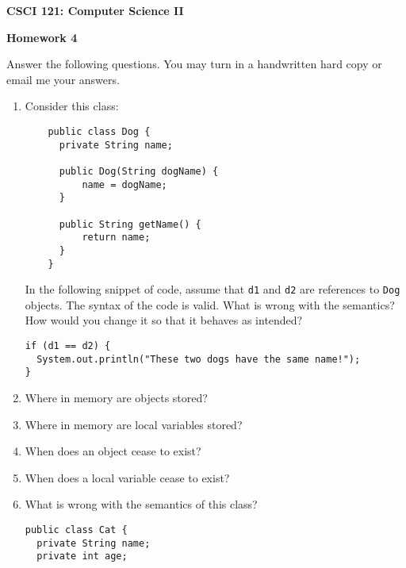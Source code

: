 \documentclass[11pt]{article}
\begin{document}
\centerline{\Large\bf CSCI 121: Computer Science II}

\vspace{.1in}

\centerline{\large\bf Homework 4}

\vspace{.25in}

Answer the following questions. You may turn in a handwritten hard copy or
email me your answers.

\begin{enumerate}
\def\labelenumi{\arabic{enumi}.}
\item
  Consider this class:

\begin{verbatim}
    public class Dog {
      private String name;
    
      public Dog(String dogName) {
          name = dogName;
      }
    
      public String getName() {
          return name;
      }
    }
\end{verbatim}

  In the following snippet of code, assume that \texttt{d1} and
  \texttt{d2} are references to \texttt{Dog} objects. The syntax of the
  code is valid. What is wrong with the semantics? How would you change
  it so that it behaves as intended?

\begin{verbatim}
if (d1 == d2) {
  System.out.println("These two dogs have the same name!");
}
\end{verbatim}

\newpage

\item
  Where in memory are objects stored?

\vfill

\item
  Where in memory are local variables stored?

\vfill

\item
  When does an object cease to exist?

\vfill

\item
  When does a local variable cease to exist?

\vfill

\newpage

\item
  What is wrong with the semantics of this class?

\begin{verbatim}
public class Cat {
  private String name;
  private int age;


\end{verbatim}
\end{enumerate}
\end{document}

